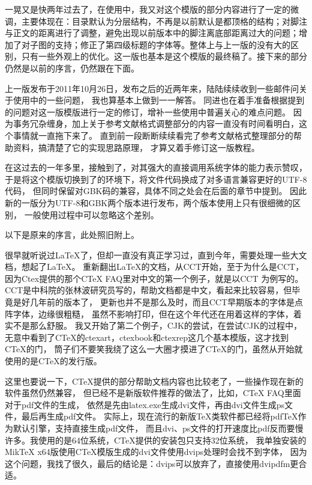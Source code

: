 \begin{preface}
	
一晃又是快两年过去了，在使用中，我又对这个模版的部分内容进行了一定的微调，主要体现在：目录默认为分层结构，不再是以前默认是都顶格的结构；对脚注与正文的距离进行了调整，避免出现以前版本中的脚注离底部距离过大的问题；增加了对子图的支持；修正了第四级标题的字体等。整体上与上一版的没有大的区别，只有一些外观上的优化。这一版也基本是这个模版的最终稿了。接下来的部分仍然是以前的序言，仍然跟在下面。
	
上一版发布于2011年10月26日，发布之后的近两年来，陆陆续续收到一些邮件问关于使用中的一些问题，
我也算基本上做到一一解答。
同进也在着手准备根据提到的问题对这一版模版进行一定的修订，增补一些使用中普遍关心的难点问题。
因为事务冗杂缠身，加上关于参考文献格式调整部分的内容一直没有时间看明白，这个事情就一直拖下来了。
直到前一段断断续续看完了参考文献格式整理部分的帮助资料，搞清楚了它的实现思路原理，
才算又着手修订这一版教程。

在这过去的一年多里，接触到了\XeTeX{}，对其强大的直接调用系统字体的能力表示赞叹，
于是将这个模版切换到了\XeTeX{}的环境下，将文件代码换成了对多语言兼容更好的UTF-8代码，
但同时保留对GBK码的兼容，具体不同之处会在后面的章节中提到。
因此新的一版分为UTF-8和GBK两个版本进行发布，两个版本使用上只有很细微的区别，
一般使用过程中可以忽略这个差别。

以下是原来的序言，此处照旧附上。


很早就听说过\LaTeX\index{\LaTeX}了，但却一直没有真正学习过，直到今年，需要处理一些大文档，想起了\LaTeX{}。
重新翻出\LaTeX{}的文档，从CCT开始，至于为什么是CCT，
因为Ctex提供的那个CTeX FAQ里对中文的第一个例子，就是以CCT
为例写的。
CCT是中科院的张林波研究员写的，帮助文档都是中文，看起来比较容易，但毕竟是好几年前的版本了，
更新也并不是那么及时，而且CCT早期版本的字体是点阵字体，边缘很粗糙，
虽然不影响打印，但在这个年代还在用着这样的字体，着实不是那么舒服。
我又开始了第二个例子，CJK的尝试，在尝试CJK的过程中，
无意中看到了CTeX的ctexart，ctexbook和ctexrep这几个基本模版，这才找到CTeX的门，
筒子们不要笑我绕了这么一大圈才摸进了CTeX的门，虽然从开始就使用的是CTeX的发行版。

这里也要说一下，CTeX提供的部分帮助文档内容也比较老了，一些操作现在新的软件虽然仍然兼容，
但已经不是新版软件推荐的做法了，比如，CTeX FAQ里面对于pdf文件的生成，
依然是先由latex.exe生成dvi文件，再由dvi文件生成ps文件，最后再生成pdf文件。
实际上，现在流行的新版\TeX{}类软件都已经将pdfTeX作为默认引擎，支持直接生成pdf文件，
而且dvi、ps文件的打开速度比pdf反而要慢许多。我使用的是64位系统，CTeX提供的安装包只支持32位系统，
我单独安装的MikTeX x64版使用CTeX模版生成的dvi文件使用dvips处理时会找不到字体，
因为这个问题，我找了很久，最后的结论是：dvips可以放弃了，直接使用dvipdfm更合适。


\end{preface}
